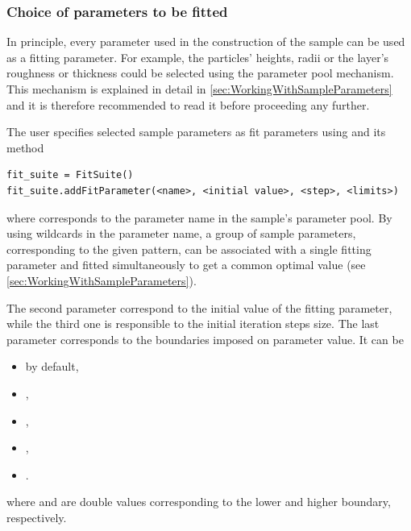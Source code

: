 \subsubsection{Choice of parameters to be fitted}

In principle, every parameter used in the construction of the sample
can be used as a fitting parameter. For example, the particles'
heights, radii or the layer's roughness or thickness could be selected
using the
parameter pool mechanism.
This mechanism is explained in detail in
\cref{sec:WorkingWithSampleParameters} and it is therefore recommended
to read it before proceeding any further.

The user specifies selected sample parameters as fit parameters using 
and its  method
\begin{lstlisting}[language=shell, style=commandline]
fit_suite = FitSuite()
fit_suite.addFitParameter(<name>, <initial value>, <step>, <limits>)
\end{lstlisting}
where  corresponds to the parameter name in the sample's parameter pool.
By using wildcards in the parameter name, a group of sample parameters, corresponding to the given
pattern, can be associated with a single fitting parameter and
fitted simultaneously to get a common optimal value (see \cref{sec:WorkingWithSampleParameters}).

The second parameter  correspond to the initial value of
the fitting parameter, while the third one
is responsible to the initial iteration steps size.
The last parameter  corresponds to
the boundaries imposed on parameter value. It can be
\begin{itemize}
\item {} by default,
\item {},
\item {},
\item {},
\item {}.
\end{itemize}
where  and  are
double values corresponding to the lower and higher boundary, respectively.


